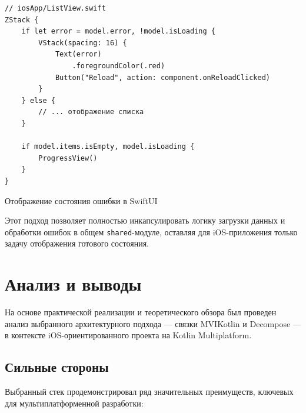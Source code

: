 \documentclass[14pt, russian]{scrartcl}
\begin{document}
\begin{listing}[H]
\begin{verbatim}
// iosApp/ListView.swift
ZStack {
    if let error = model.error, !model.isLoading {
        VStack(spacing: 16) {
            Text(error)
                .foregroundColor(.red)
            Button("Reload", action: component.onReloadClicked)
        }
    } else {
        // ... отображение списка
    }

    if model.items.isEmpty, model.isLoading {
        ProgressView()
    }
}
\end{verbatim}
\caption{Отображение состояния ошибки в SwiftUI}
\label{lst:swift_error_handling}
\end{listing}

Этот подход позволяет полностью инкапсулировать логику загрузки данных и обработки ошибок в общем \texttt{shared}-модуле, оставляя для iOS-приложения только задачу отображения готового состояния.

\section{Анализ и выводы}

На основе практической реализации и теоретического обзора был проведен анализ выбранного архитектурного подхода — связки MVIKotlin и Decompose — в контексте iOS-ориентированного проекта на Kotlin Multiplatform.

\subsection{Сильные стороны}

Выбранный стек продемонстрировал ряд значительных преимуществ, ключевых для мультиплатформенной разработки:
\end{document}

